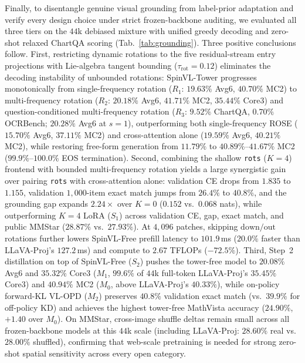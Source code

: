 \documentclass[10pt,twocolumn,letterpaper]{article}
\newcommand{\modelname}{SpinVL}
\begin{document}
Finally, to disentangle genuine visual grounding from label-prior adaptation
and verify every design choice under strict frozen-backbone auditing, we
evaluated all three tiers on the $44$k debiased mixture with unified greedy
decoding and zero-shot relaxed ChartQA scoring (Tab.~\ref{tab:grounding}). Three
positive conclusions follow. First, restricting dynamic rotations to the five
residual-stream entry projections with Lie-algebra tangent bounding
($\tau_{\mathrm{rot}}{=}0.12$) eliminates the decoding instability of unbounded
rotations: \modelname-Tower progresses monotonically from single-frequency
rotation ($R_1$: $19.63\%$ Avg6, $40.70\%$ MC2) to multi-frequency rotation
($R_2$: $20.18\%$ Avg6, $41.71\%$ MC2, $35.44\%$ Core3) and question-conditioned
multi-frequency rotation ($R_3$: $9.52\%$ ChartQA, $0.70\%$ OCRBench; $20.28\%$
Avg6 at $s{=}1$), outperforming both single-frequency ROSE ($15.70\%$ Avg6,
$37.11\%$ MC2) and cross-attention alone ($19.59\%$ Avg6, $40.21\%$ MC2), while
restoring free-form generation from $11.79\%$ to $40.89\%$--$41.67\%$ MC2
($99.9\%$--$100.0\%$ EOS termination). Second, combining the shallow \texttt{rots}
($K{=}4$) frontend with bounded multi-frequency rotation yields a large
synergistic gain over pairing \texttt{rots} with cross-attention alone: validation
CE drops from $1.835$ to $1.155$, validation $1{,}000$-item exact match jumps
from $26.4\%$ to $40.8\%$, and the grounding gap expands $2.24\times$ over
$K{=}0$ ($0.152$ vs.\ $0.068$ nats), while outperforming $K{=}4$ LoRA ($S_1$)
across validation CE, gap, exact match, and public MMStar ($28.87\%$ vs.\
$27.93\%$). At $4{,}096$ patches, skipping $\text{down}/\text{out}$ rotations
further lowers \modelname-Free{} prefill latency to $101.9$\,ms ($20.0\%$ faster
than LLaVA-Proj's $127.2$\,ms) and compute to $2.67$ TFLOPs ($-72.5\%$). Third,
Step~2 distillation on top of \modelname-Free{} ($S_2$) pushes the tower-free
model to $20.08\%$ Avg6 and $35.32\%$ Core3 ($M_1$, $99.6\%$ of $44$k
full-token LLaVA-Proj's $35.45\%$ Core3) and $40.94\%$ MC2 ($M_0$, above
LLaVA-Proj's $40.33\%$), while on-policy forward-KL VL-OPD ($M_2$) preserves
$40.8\%$ validation exact match (vs.\ $39.9\%$ for off-policy KD) and achieves
the highest tower-free MathVista accuracy ($24.90\%$, $+1.40$ over $M_0$). On
MMStar, cross-image shuffle deltas remain small across all frozen-backbone
models at this $44$k scale (including LLaVA-Proj: $28.60\%$ real vs.\ $28.00\%$
shuffled), confirming that web-scale pretraining is needed for strong zero-shot
spatial sensitivity across every open category.
\end{document}
